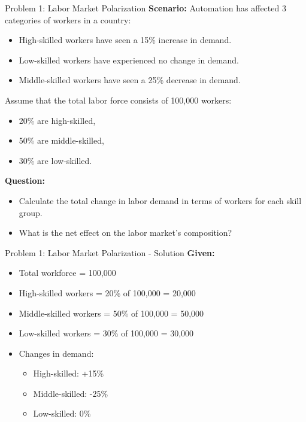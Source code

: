 \documentclass{beamer}
\begin{document}
\begin{frame}{Problem 1: Labor Market Polarization}
\textbf{Scenario:}
Automation has affected 3 categories of workers in a country:
\begin{itemize}
    \item High-skilled workers have seen a 15\% increase in demand.
    \item Low-skilled workers have experienced no change in demand.
    \item Middle-skilled workers have seen a 25\% decrease in demand.
\end{itemize}

Assume that the total labor force consists of 100,000 workers:
\begin{itemize}
    \item 20\% are high-skilled,
    \item 50\% are middle-skilled,
    \item 30\% are low-skilled.
\end{itemize}

\textbf{Question:}
\begin{itemize}
    \item Calculate the total change in labor demand in terms of workers for each skill group.
    \item What is the net effect on the labor market's composition?
\end{itemize}
\end{frame}


\begin{frame}{Problem 1: Labor Market Polarization - Solution}
\textbf{Given:}
\begin{itemize}
    \item Total workforce = 100,000
    \item High-skilled workers = 20\% of 100,000 = 20,000
    \item Middle-skilled workers = 50\% of 100,000 = 50,000
    \item Low-skilled workers = 30\% of 100,000 = 30,000
    \item Changes in demand:
    \begin{itemize}
        \item High-skilled: +15\%
        \item Middle-skilled: -25\%
        \item Low-skilled: 0\%
    \end{itemize}
\end{itemize}


\end{frame}
\end{document}
